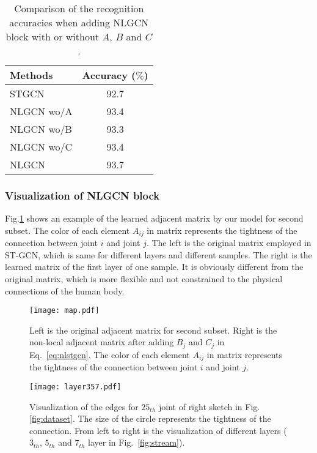 \documentclass[10pt,twocolumn,letterpaper]{article}
\begin{document}
\begin{table}[htb]
 	\begin{center}
		\label{tab:nlgcn}
		\begin{tabular}{lc}
			\hline
			Methods     & Accuracy ($\%$)    \\
			\hline
			STGCN & 92.7        \\
            NLGCN wo/A  & 93.4          \\
            NLGCN wo/B  & 93.3          \\
			NLGCN wo/C  & 93.4       \\
            NLGCN     & 93.7          \\
			\hline
		\end{tabular}
        \end{center}
     	\caption{Comparison of the recognition accuracies when adding NLGCN block with or without $A$, $B$ and $C$.}
	\end{table}
    
    \subsubsection{Visualization of NLGCN block}
    Fig.\ref{fig:map} shows an example of the learned adjacent matrix by our model for second subset.
	The color of each element $A_{ij}$ in matrix represents the tightness of the connection between joint $i$ and joint $j$. The left is the original matrix employed in ST-GCN, which is same for different layers and different samples. The right is the learned matrix of the first layer of one sample. It is obviously different from the original matrix, which is more flexible and not constrained to the physical connections of the human body.
    \begin{figure}[!htb]
	\begin{center}
	\texttt{[image: map.pdf]}
	\caption{Left is the original adjacent matrix for second subset. Right is the non-local adjacent matrix after adding $B_j$ and $C_j$ in Eq.~\ref{eq:nlstgcn}. The color of each element $A_{ij}$ in matrix represents the tightness of the connection between joint $i$ and joint $j$.}
	\label{fig:map}	
	\end{center}
	\end{figure}

    \begin{figure}[!htb]
	\begin{center}
	\texttt{[image: layer357.pdf]}
	\caption{Visualization of the edges for $25_{th}$ joint of right sketch in Fig.\ref{fig:dataset}. The size of the circle represents the tightness of the connection. From left to right is the visualization of different layers ($3_{th}$, $5_{th}$ and $7_{th}$ layer in Fig.~\ref{fig:stream}).}
	\label{fig:layer357}	
	\end{center}
	\end{figure}
\end{document}
